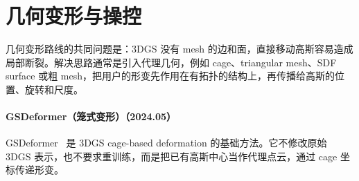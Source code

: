 \section{几何变形与操控}

几何变形路线的共同问题是：3DGS 没有 mesh 的边和面，直接移动高斯容易造成局部断裂。解决思路通常是引入代理几何，例如 cage、triangular mesh、SDF surface 或粗 mesh，把用户的形变先作用在有拓扑的结构上，再传播给高斯的位置、旋转和尺度。
\paragraph{GSDeformer（笼式变形）（2024.05）}
GSDeformer~\cite{2405_15491} 是 3DGS cage-based deformation 的基础方法。它不修改原始 3DGS 表示，也不要求重训练，而是把已有高斯中心当作代理点云，通过 cage 坐标传递形变。


